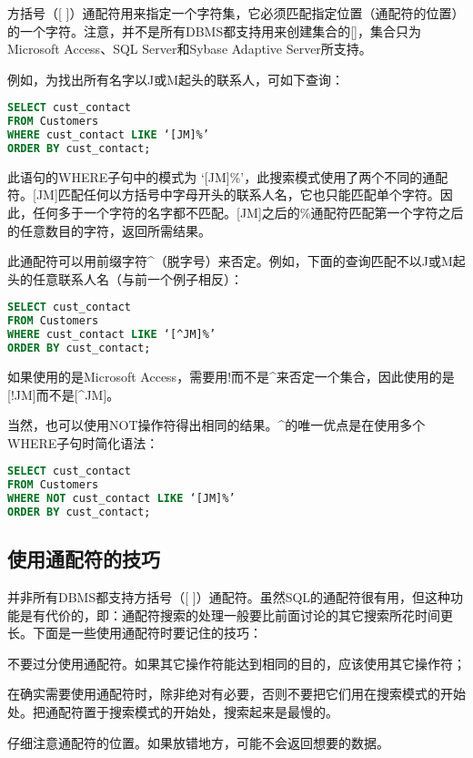 方括号（[ ]）通配符用来指定一个字符集，它必须匹配指定位置（通配符的位置）的一个字符。注意，并不是所有DBMS都支持用来创建集合的[]，集合只为Microsoft Access、SQL Server和Sybase Adaptive Server所支持。

例如，为找出所有名字以J或M起头的联系人，可如下查询：

\begin{lstlisting}[language=SQL]
SELECT cust_contact
FROM Customers
WHERE cust_contact LIKE ‘[JM]%’
ORDER BY cust_contact;
\end{lstlisting}

此语句的WHERE子句中的模式为 ‘[JM]\%’，此搜索模式使用了两个不同的通配符。[JM]匹配任何以方括号中字母开头的联系人名，它也只能匹配单个字符。因此，任何多于一个字符的名字都不匹配。[JM]之后的\%通配符匹配第一个字符之后的任意数目的字符，返回所需结果。

此通配符可以用前缀字符\^{}（脱字号）来否定。例如，下面的查询匹配不以J或M起头的任意联系人名（与前一个例子相反）：

\begin{lstlisting}[language=SQL]
SELECT cust_contact
FROM Customers
WHERE cust_contact LIKE ‘[^JM]%’
ORDER BY cust_contact;
\end{lstlisting}

如果使用的是Microsoft Access，需要用!而不是\^{}来否定一个集合，因此使用的是[!JM]而不是[\^{}JM]。

当然，也可以使用NOT操作符得出相同的结果。\^{}的唯一优点是在使用多个WHERE子句时简化语法：

\begin{lstlisting}[language=SQL]
SELECT cust_contact
FROM Customers
WHERE NOT cust_contact LIKE ‘[JM]%’
ORDER BY cust_contact;
\end{lstlisting}

\subsection{使用通配符的技巧}

并非所有DBMS都支持方括号（[ ]）通配符。虽然SQL的通配符很有用，但这种功能是有代价的，即：通配符搜索的处理一般要比前面讨论的其它搜索所花时间更长。下面是一些使用通配符时要记住的技巧：

\begin{compactitem}
\item 不要过分使用通配符。如果其它操作符能达到相同的目的，应该使用其它操作符；
\item 在确实需要使用通配符时，除非绝对有必要，否则不要把它们用在搜索模式的开始处。把通配符置于搜索模式的开始处，搜索起来是最慢的。
\item 仔细注意通配符的位置。如果放错地方，可能不会返回想要的数据。
\end{compactitem}


